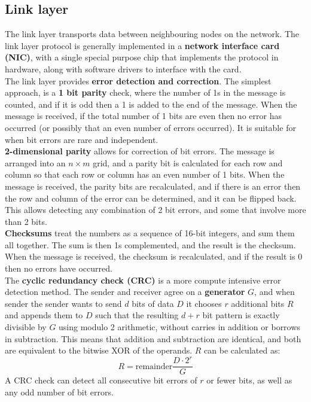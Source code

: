 \subsection{Link layer}
The link layer transports data between neighbouring nodes on the network. The link layer protocol is generally implemented in a \textbf{network interface card (NIC)}, with a single special purpose chip that implements the protocol in hardware, along with software drivers to interface with the card.\\
The link layer provides \textbf{error detection and correction}. The simplest approach, is a \textbf{1 bit parity} check, where the number of 1s in the message is counted, and if it is odd then a 1 is added to the end of the message. When the message is received, if the total number of 1 bits are even then no error has occurred (or possibly that an even number of errors occurred). It is suitable for when bit errors are rare and independent.\\
\textbf{2-dimensional parity} allows for correction of bit errors. The message is arranged into an $n\times m$ grid, and a parity bit is calculated for each row and column so that each row or column has an even number of 1 bits. When the message is received, the parity bits are recalculated, and if there is an error then the row and column of the error can be determined, and it can be flipped back. This allows detecting any combination of 2 bit errors, and some that involve more than 2 bits.\\
\textbf{Checksums} treat the numbers as a sequence of 16-bit integers, and sum them all together. The sum is then 1s complemented, and the result is the checksum. When the message is received, the checksum is recalculated, and if the result is 0 then no errors have occurred.\\
The \textbf{cyclic redundancy check (CRC)} is a more compute intensive error detection method. The sender and receiver agree on a \textbf{generator} $G$, and when sender the sender wants to send $d$ bits of data $D$ it chooses $r$ additional bits $R$ and appends them to $D$ such that the resulting $d+r$ bit pattern is exactly divisible by $G$ using modulo 2 arithmetic, without carries in addition or borrows in subtraction. This means that addition and subtraction are identical, and both are equivalent to the bitwise XOR of the operands. $R$ can be calculated as:
$$
	R=\text{remainder}\frac{D\cdot2^r}{G}
$$
A CRC check can detect all consecutive bit errors of $r$ or fewer bits, as well as any odd number of bit errors.

